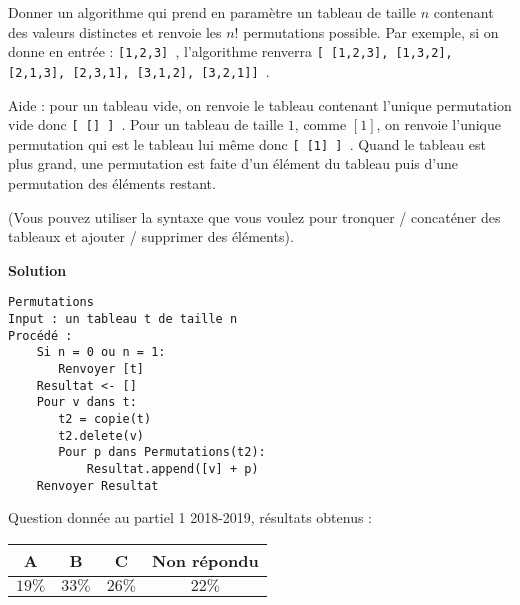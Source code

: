 
\begin{exercice}[2019 -- 2020]
Donner un algorithme qui prend en paramètre un tableau de taille $n$ contenant des valeurs distinctes et renvoie les $n!$ permutations possible.
Par exemple, si on donne en entrée : {\tt [1,2,3] }, l'algorithme renverra {\tt [ [1,2,3], [1,3,2], [2,1,3], [2,3,1], [3,1,2], [3,2,1]] }. 

Aide : pour un tableau vide, on renvoie le tableau contenant l'unique permutation vide donc {\tt [ [] ] }. Pour un tableau de taille $1$, comme $[1]$, on renvoie l'unique permutation qui est le tableau lui même donc {\tt [ [1] ] }. Quand le tableau est plus grand, une permutation est faite d'un élément du tableau puis d'une permutation des éléments restant.

(Vous pouvez utiliser la syntaxe que vous voulez pour tronquer / concaténer des tableaux et ajouter / supprimer des éléments).

\textbf{Solution}


\begin{lstlisting}
Permutations
Input : un tableau t de taille n
Procédé :
    Si n = 0 ou n = 1:
       Renvoyer [t]
    Resultat <- []
    Pour v dans t:
       t2 = copie(t)
       t2.delete(v)
       Pour p dans Permutations(t2):
           Resultat.append([v] + p)
    Renvoyer Resultat
\end{lstlisting}

Question donnée au partiel 1 2018-2019, résultats obtenus :

\begin{tabular}{|c|c|c|c|}
\hline
A & B & C & Non répondu  \\ \hline
$19\%$ & $33\%$ & $26\%$ & $22\%$ \\ \hline
\end{tabular} 


\end{exercice}